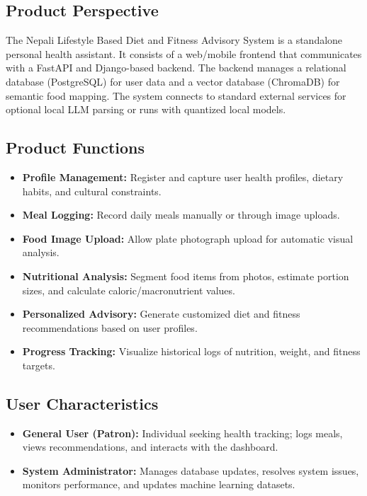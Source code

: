 \documentclass[11pt,a4paper]{article}
\begin{document}
\subsection{Product Perspective}
The Nepali Lifestyle Based Diet and Fitness Advisory System is a standalone personal health assistant. It consists of a web/mobile frontend that communicates with a FastAPI and Django-based backend. The backend manages a relational database (PostgreSQL) for user data and a vector database (ChromaDB) for semantic food mapping. The system connects to standard external services for optional local LLM parsing or runs with quantized local models.

\subsection{Product Functions}
\begin{itemize}[leftmargin=*]
  \item \textbf{Profile Management:} Register and capture user health profiles, dietary habits, and cultural constraints.
  \item \textbf{Meal Logging:} Record daily meals manually or through image uploads.
  \item \textbf{Food Image Upload:} Allow plate photograph upload for automatic visual analysis.
  \item \textbf{Nutritional Analysis:} Segment food items from photos, estimate portion sizes, and calculate caloric/macronutrient values.
  \item \textbf{Personalized Advisory:} Generate customized diet and fitness recommendations based on user profiles.
  \item \textbf{Progress Tracking:} Visualize historical logs of nutrition, weight, and fitness targets.
\end{itemize}

\subsection{User Characteristics}
\begin{itemize}[leftmargin=*]
  \item \textbf{General User (Patron):} Individual seeking health tracking; logs meals, views recommendations, and interacts with the dashboard.
  \item \textbf{System Administrator:} Manages database updates, resolves system issues, monitors performance, and updates machine learning datasets.
\end{itemize}
\end{document}
